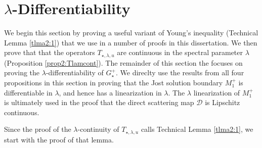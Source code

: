 \documentclass[../dissertation]{subfiles}
\begin{document}
\section{$\lambda$-Differentiability}\label{sec2:diff}

We begin this section by proving a useful variant of Young's inequality
(Technical Lemma \ref{tlma2:1}) that we use in a number of proofs in this 
dissertation. We then prove that that the operators $T_{\star, \lambda, u}$ are
continuous in the spectral parameter $\lambda$ (Proposition 
\ref{prop2:Tlamcont}). The remainder of this section the focuses on proving the 
$\lambda$-differentiability of $G_{\star}^+$. We direclty use the results 
from all four propositions in this section in proving that the Jost solution 
boundary $M_1^+$ is differentiable in $\lambda$, and hence has a 
linearization in $\lambda$. The $\lambda$ linearization of $M_1^+$ is ultimately 
used in the proof that the direct scattering map $\mathscr D$ is Lipschitz 
continuous.

Since the proof of the $\lambda$-continuity of $T_{\star, \lambda, u}$ calls
Technical Lemma \ref{tlma2:1}, we start with the proof of that lemma.
\end{document}
